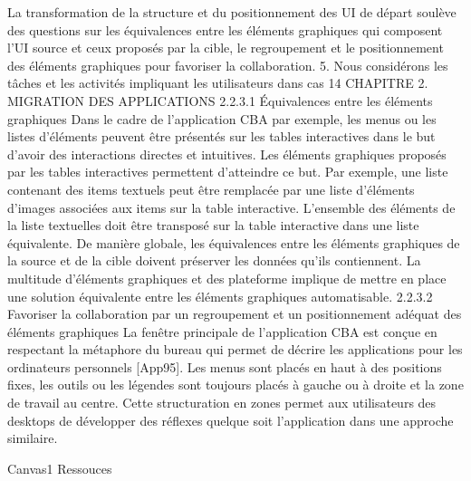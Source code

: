 \documentclass{article}
\begin{document}
La transformation de la structure et du positionnement des UI de d\'{e}part soul\`{e}ve des questions
sur les \'{e}quivalences entre les \'{e}l\'{e}ments graphiques qui composent l’UI source et ceux propos\'{e}s par la
cible, le regroupement et le positionnement des \'{e}l\'{e}ments graphiques pour favoriser la collaboration.
5. Nous consid\'{e}rons les t\^{a}ches et les activit\'{e}s impliquant les utilisateurs dans cas
14
CHAPITRE 2. MIGRATION DES APPLICATIONS
2.2.3.1
Équivalences entre les \'{e}l\'{e}ments graphiques
Dans le cadre de l’application CBA par exemple, les menus ou les listes d’\'{e}l\'{e}ments peuvent
\^{e}tre pr\'{e}sent\'{e}s sur les tables interactives dans le but d’avoir des interactions directes et intuitives. Les
\'{e}l\'{e}ments graphiques propos\'{e}s par les tables interactives permettent d’atteindre ce but. Par exemple,
une liste contenant des items textuels peut \^{e}tre remplac\'{e}e par une liste d’\'{e}l\'{e}ments d’images associ\'{e}es
aux items sur la table interactive. L’ensemble des \'{e}l\'{e}ments de la liste textuelles doit \^{e}tre transpos\'{e} sur
la table interactive dans une liste \'{e}quivalente.
De mani\`{e}re globale, les \'{e}quivalences entre les \'{e}l\'{e}ments graphiques de la source et de la cible
doivent pr\'{e}server les donn\'{e}es qu’ils contiennent. La multitude d’\'{e}l\'{e}ments graphiques et des plateforme implique de mettre en place une solution \'{e}quivalente entre les \'{e}l\'{e}ments graphiques automatisable.
2.2.3.2
Favoriser la collaboration par un regroupement et un positionnement ad\'{e}quat des \'{e}l\'{e}ments graphiques
La fen\^{e}tre principale de l’application CBA est con\c{c}ue en respectant la m\'{e}taphore du bureau qui
permet de d\'{e}crire les applications pour les ordinateurs personnels [App95]. Les menus sont plac\'{e}s en
haut \`{a} des positions ﬁxes, les outils ou les l\'{e}gendes sont toujours plac\'{e}s \`{a} gauche ou \`{a} droite et la zone
de travail au centre. Cette structuration en zones permet aux utilisateurs des desktops de d\'{e}velopper
des r\'{e}ﬂexes quelque soit l’application dans une approche similaire.
 
Canvas1
Ressouces
 
\end{document}
